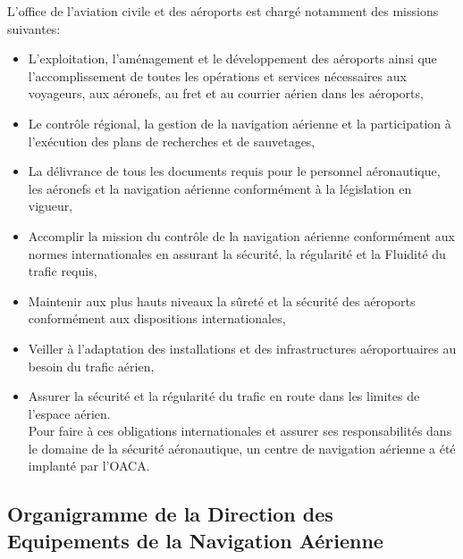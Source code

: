 L'office de l'aviation civile et des aéroports est chargé notamment des missions suivantes:\\
\begin{itemize}
\item L'exploitation, l'aménagement et le développement des aéroports ainsi que l'accomplissement de toutes les opérations et services nécessaires aux voyageurs, aux aéronefs, au fret et au courrier aérien dans les aéroports, \\
\item Le contrôle régional, la gestion de la navigation aérienne et la participation à l'exécution des plans de recherches et de sauvetages, \\
\item La délivrance de tous les documents requis pour le personnel aéronautique, les aéronefs et la navigation aérienne conformément à la législation en vigueur, \\
\item Accomplir la mission du contrôle de la navigation aérienne conformément aux normes internationales en assurant la sécurité, la régularité et la  Fluidité du trafic requis, \\
\item Maintenir aux plus hauts niveaux la sûreté et la sécurité des aéroports conformément aux dispositions internationales, \\
\item Veiller à l'adaptation des installations et des infrastructures aéroportuaires au besoin du trafic aérien, \\
\item Assurer la sécurité et la régularité du trafic en route dans les limites de l'espace aérien. \\
Pour faire à ces obligations internationales et assurer ses responsabilités dans le domaine de la sécurité aéronautique, un centre de navigation aérienne a été implanté par l'OACA. \\
\end{itemize}
\subsection{Organigramme de la Direction des Equipements de la Navigation Aérienne}

